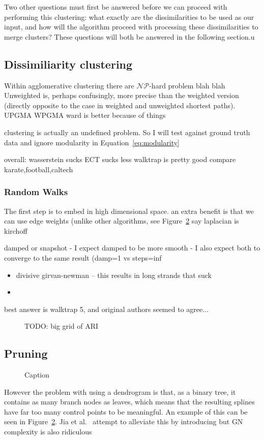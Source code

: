 Two other questions must first be answered before we can proceed with performing this clustering: what exactly are the dissimilarities to be used as our input, and how will the algorithm proceed with processing these dissimilarities to merge clusters? These questions will both be answered in the following section.u

\subsection{Dissimiliarity clustering}
\label{sec:dissimilarities}

Within agglomerative clustering there are 
$\mathcal{NP}$-hard problem blah blah
Unweighted is, perhaps confusingly, more precise than the weighted version (directly opposite to the case in weighted and unweighted shortest paths). 
UPGMA WPGMA ward is better because of things

clustering is actually an undefined problem. So I will test against ground truth data and ignore modularity in Equation~\eqref{eq:modularity}

overall:
wasserstein sucks
ECT sucks less \cite{Albano2012}
walktrap is pretty good
compare karate,football,caltech

\subsubsection{Random Walks}
The first step is to embed in high dimensional space.
an extra benefit is that we can use edge weights (unlike other algorithms, see Figure~\ref{fig:lesmis}
say laplacian is kirchoff

damped or snapshot
 - I expect damped to be more smooth
 - I also expect both to converge to the same result (damp=1 vs steps=inf

\begin{itemize}
    \item divisive girvan-newman -- this results in long strands that suck
    \item
\end{itemize}

best answer is walktrap 5, and original authors seemed to agree...

\begin{figure}
    \caption{TODO: big grid of ARI}
    \label{fig:ARI}
\end{figure}

\subsection{Pruning}
\label{sec:pruning}
\begin{figure}
    \caption{Caption}
    \label{fig:lesmis}
\end{figure}
However the problem with using a dendrogram is that, as a binary tree, it contains as many branch nodes as leaves, which means that the resulting splines have far too many control points to be meaningful. An example of this can be seen in Figure~\ref{fig:lesmis}.
Jia et al.~\cite{Jia2011} attempt to alleviate this by introducing 
but GN complexity is also ridiculous

